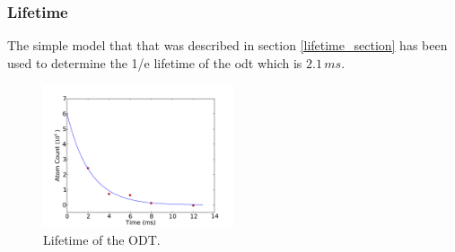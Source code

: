 \subsubsection{Lifetime}
The simple model that that was described in section \ref{lifetime_section} has been used to determine the 1/e lifetime of the \gls{odt} which is $2.1\,\unit{ms}$.

\begin{figure}[h]
\centering
\includegraphics[width=0.5\textwidth]{figs/lifetime.pdf}
\caption{Lifetime of the ODT.}
\label{fig:lifetime}
\end{figure}
